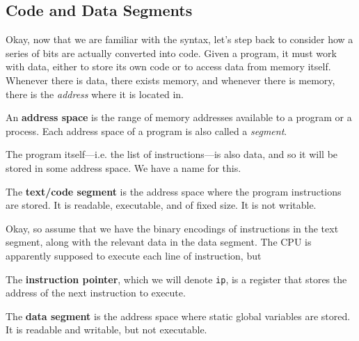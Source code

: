 \subsection{Code and Data Segments}

  Okay, now that we are familiar with the syntax, let's step back to consider how a series of bits are actually converted into code. Given a program, it must work with data, either to store its own code or to access data from memory itself. Whenever there is data, there exists memory, and whenever there is memory, there is the \textit{address} where it is located in. 

  \begin{definition}
    An \textbf{address space} is the range of memory addresses available to a program or a process. Each address space of a program is also called a \textit{segment}. 
  \end{definition}

  The program itself---i.e. the list of instructions---is also data, and so it will be stored in some address space. We have a name for this. 

  \begin{definition}
    The \textbf{text/code segment} is the address space where the program instructions are stored. It is readable, executable, and of fixed size. It is not writable. 
  \end{definition}

  Okay, so assume that we have the binary encodings of instructions in the text segment, along with the relevant data in the data segment. The CPU is apparently supposed to execute each line of instruction, but 

  \begin{definition}
    The \textbf{instruction pointer}, which we will denote \texttt{ip}, is a register that stores the address of the next instruction to execute. 
  \end{definition}

  \begin{example}

  \end{example}

  \begin{definition}
    The \textbf{data segment} is the address space where static global variables are stored. It is readable and writable, but not executable.
  \end{definition}

